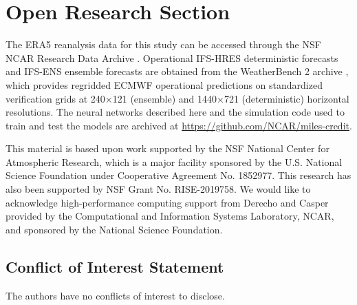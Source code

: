 \documentclass{agujournal2019}
\begin{document}


\section*{Open Research Section}
The ERA5 reanalysis data for this study can be accessed through the NSF NCAR Research Data Archive \cite{hersbach2020era5}. Operational IFS-HRES deterministic forecasts and IFS-ENS ensemble forecasts are obtained from the WeatherBench 2 archive \cite{rasp2023weatherbench2}, which provides regridded ECMWF operational predictions on standardized verification grids at 240×121 (ensemble) and 1440×721 (deterministic) horizontal resolutions. The neural networks described here and the simulation code used to train and test the models are archived at \url{https://github.com/NCAR/miles-credit}. 

\acknowledgments
This material is based upon work supported by the NSF National Center for Atmospheric Research, which is a major facility sponsored by the U.S. National Science Foundation under Cooperative Agreement No. 1852977. This research has also been supported by NSF Grant No. RISE-2019758. We would like to acknowledge high-performance computing support from Derecho and Casper \cite{Cheyenne} provided by the Computational and Information Systems Laboratory, NCAR, and sponsored by the National Science Foundation. 

\subsection*{Conflict of Interest Statement}
The authors have no conflicts of interest to disclose.


\end{document}
